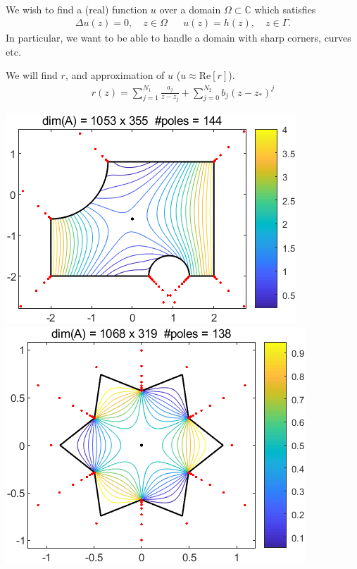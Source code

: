\documentclass{seminar}
\begin{document}
\begin{slide} %
{} \small \\

We wish to find a (real) function $u$ over a domain $\Omega \subset \mathds{C}$ which satisfies
\begin{align*}
\Delta u(z)=0, \quad z\in \Omega &&
u(z)=h(z), \quad z\in \Gamma .
\end{align*}
In particular, we want to be able to handle a domain with sharp corners, curves etc. 

We will find $r$, and approximation of $u$ ($u\approx\mathrm{Re}[r]$).
\begin{align*}
r(z)= \sum_{j=1}^{N_1} \frac{a_j}{z-z_j} + \sum_{j=0}^{N_2} b_j (z-z_*)^j
\end{align*}
\begin{multicols}{3}
\includegraphics[scale=.45]{./PNG/Howell_1994}
\includegraphics[scale=.4]{./PNG/snowflake}

\end{multicols}
\end{slide}
\end{document}
